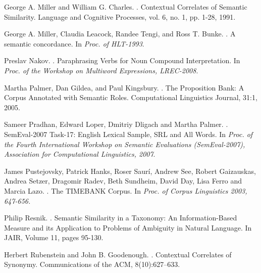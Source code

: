 \documentclass[11pt]{article}
\begin{document}
\begin{thebibliography}{}
George A. Miller and William G. Charles.
.
\newblock Contextual Correlates of Semantic Similarity.
\newblock Language and Cognitive Processes, vol. 6, no. 1, pp. 1-28, 1991.

George A. Miller, Claudia Leacock, Randee Tengi, and Ross T. Bunke.
.
\newblock A semantic concordance.
\newblock In \textit{Proc. of HLT-1993}.

Preslav Nakov.
.
\newblock Paraphrasing Verbs for Noun Compound Interpretation.
\newblock In \textit{Proc. of the Workshop on Multiword Expressions, LREC-2008}.



Martha Palmer, Dan Gildea, and Paul Kingsbury.
.
\newblock The Proposition Bank: A Corpus Annotated with Semantic Roles.
\newblock Computational Linguistics Journal, 31:1, 2005.

Sameer Pradhan, Edward Loper, Dmitriy Dligach and Martha Palmer. 
.
\newblock SemEval-2007 Task-17: English Lexical Sample, SRL and All Words. 
\newblock In \textit{ Proc. of the Fourth International Workshop on Semantic Evaluations (SemEval-2007), Association for Computational Linguistics, 2007}.

James Pustejovsky, Patrick Hanks, Roser Saurí, Andrew See, Robert Gaizauskas, Andrea Setzer, Dragomir Radev, Beth Sundheim, David Day, Lisa Ferro and Marcia Lazo.
.
\newblock The TIMEBANK Corpus. 
\newblock In \textit{Proc. of Corpus Linguistics 2003, 647-656.}

Philip Resnik. 
.
\newblock Semantic Similarity in a Taxonomy: An Information-Based Measure and its Application to Problems of Ambiguity in Natural Language.
\newblock In JAIR, Volume 11, pages 95-130.

Herbert Rubenstein and John B. Goodenough.
.
\newblock Contextual Correlates of Synonymy.
\newblock Communications of the ACM, 8(10):627--633.


\end{thebibliography}
\end{document}
